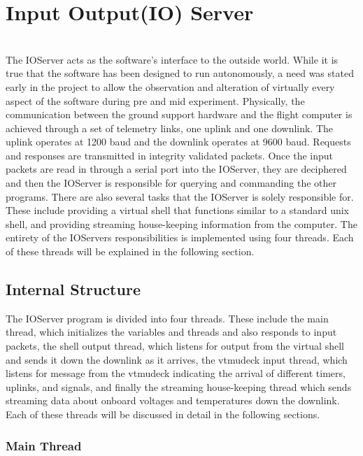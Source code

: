 %
\section{\bf I\rm nput \bf O\rm utput(IO) Server}
\hrulefill
\\ 
The IOServer acts as the software's interface to the outside world. While it is true
that the software has been designed to run autonomously, a need was stated early in 
the project to allow the observation and alteration of virtually every aspect of the
software during pre and mid experiment. Physically, the communication between the
ground support hardware and the flight computer is achieved through a set of telemetry
links, one uplink and one downlink. The uplink operates at 1200 baud and the downlink
operates at 9600 baud. Requests and responses are transmitted in integrity validated
packets. Once the input packets are read in through a serial port into the IOServer,
they are deciphered and then the IOServer is responsible for querying and commanding
the other programs. There are also several tasks that the IOServer is solely responsible
for. These include providing a virtual shell that functions similar to a standard unix
shell, and providing streaming house-keeping information from the computer. The entirety 
of the IOServers responsibilities is implemented using four threads. Each of these threads
will be explained in the following section.
 
\subsection{Internal Structure}

The IOServer program is divided into four threads. These include the main thread, which
initializes the variables and threads and also responds to input packets, the shell output thread,
which listens for output from the virtual shell and sends it down the downlink as it arrives, the 
vtmudeck input thread, which listens for message from the vtmudeck indicating the arrival of different
timers, uplinks, and signals, and finally the streaming house-keeping thread which sends streaming
data about onboard voltages and temperatures down the downlink. Each of these threads will be discussed
in detail in the following sections.

\subsubsection{Main Thread}


